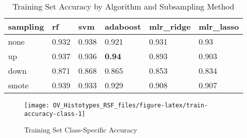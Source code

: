\documentclass[
]{report}
\begin{document}
\begin{table}

\caption{\label{tab:train-accuracy-table}Training Set Accuracy by Algorithm and Subsampling Method}
\centering
\begin{tabular}[t]{l|l|l|l|l|l}
\hline
sampling & rf & svm & adaboost & mlr\_ridge & mlr\_lasso\\
\hline
none & 0.932 & 0.938 & 0.921 & 0.931 & 0.93\\
\hline
up & 0.937 & 0.936 & \textbf{0.94} & 0.893 & 0.903\\
\hline
down & 0.871 & 0.868 & 0.865 & 0.853 & 0.834\\
\hline
smote & 0.939 & 0.933 & 0.929 & 0.908 & 0.907\\
\hline
\end{tabular}
\end{table}

\begin{figure}[H]

{\centering \texttt{[image: OV\_Histotypes\_RSF\_files/figure-latex/train-accuracy-class-1]} 

}

\caption{Training Set Class-Specific Accuracy}\label{fig:train-accuracy-class}
\end{figure}
\end{document}
